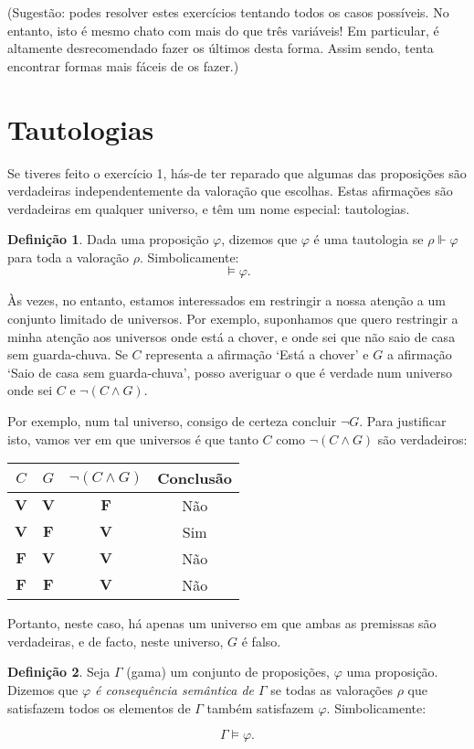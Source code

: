 \documentclass{article}
\theoremstyle{definition}
\newtheorem{definicao}{Definição}
\theoremstyle{remark}
\newcommand{\V}{\mathbf{V}}
\newcommand{\F}{\mathbf{F}}
\begin{document}
	(Sugestão: podes resolver estes exercícios tentando todos os casos possíveis. No entanto, isto é mesmo chato com mais do que três variáveis! Em particular, é altamente desrecomendado fazer os últimos desta forma. Assim sendo, tenta encontrar formas mais fáceis de os fazer.)
	
	\section{Tautologias}
	
	Se tiveres feito o exercício 1, hás-de ter reparado que algumas das proposições são verdadeiras independentemente da valoração que escolhas. Estas afirmações são verdadeiras em qualquer universo, e têm um nome especial: tautologias.
	
	\begin{definicao}
	Dada uma proposição $\varphi$, dizemos que $\varphi$ é uma tautologia se $\rho \Vdash \varphi$ para toda a valoração $\rho$. Simbolicamente:
	\[\vDash \varphi.\]
	\end{definicao}
	
	Às vezes, no entanto, estamos interessados em restringir a nossa atenção a um conjunto limitado de universos. Por exemplo, suponhamos que quero restringir a minha atenção aos universos onde está a chover, e onde sei que não saio de casa sem guarda-chuva. Se $C$ representa a afirmação `Está a chover' e $G$ a afirmação `Saio de casa sem guarda-chuva', posso averiguar o que é verdade num universo onde sei $C$ e $\neg (C \land G)$.
	
	Por exemplo, num tal universo, consigo de certeza concluir $\neg G$. Para justificar isto, vamos ver em que universos é que tanto $C$ como $\neg (C \land G)$ são verdadeiros:
	
	\begin{tabular}{|c|c|c|c|}
	\hline
	$C$ & $G$ & $\neg(C \land G)$ & Conclusão \\
	\hline
	$\V$ & $\V$ & $\F$ & Não \\
	$\V$ & $\F$ & $\V$ & Sim \\
	$\F$ & $\V$ & $\V$ & Não \\
	$\F$ & $\F$ & $\V$ & Não \\
	\hline
	\end{tabular}
	\smallskip
	
	Portanto, neste caso, há apenas um universo em que ambas as premissas são verdadeiras, e de facto, neste universo, $G$ é falso.
	
	\begin{definicao}
	Seja $\Gamma$ (gama) um conjunto de proposições, $\varphi$ uma proposição. Dizemos que \emph{$\varphi$ é consequência semântica de $\Gamma$} se todas as valorações $\rho$ que satisfazem todos os elementos de $\Gamma$ também satisfazem $\varphi$. Simbolicamente:
	
	\[\Gamma \vDash \varphi.\]
	\end{definicao}
	
\end{document}
